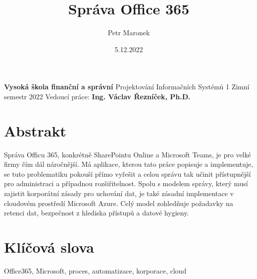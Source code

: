 \documentclass[12pt]{article}
\title{Správa Office 365}
\author{Petr Maronek}
\date{5.12.2022}
\begin{document}
    \begin{sloppypar}
	\begin{spacing}{1.15}
        \rmfamily
		\maketitle
		\begin{center}
			\textbf{Vysoká škola finanční a správní}\linebreak
			Projektování Informačních Systémů 1\linebreak
			Zimní semestr 2022\linebreak
			Vedoucí práce: \textbf{Ing. Václav Řezníček, Ph.D.}
		\end{center}
		\pagebreak

		\section*{Abstrakt}
		Správa Officu 365, konkrétně SharePointu Online a Microsoft Teams, je pro velké 
        firmy čím dál náročnější. Má aplikace, kterou tato práce popisuje a implementuje, 
        se tuto problematiku pokouší přímo vyřešit a celou správu tak učinit přístupnější 
        pro administraci a případnou rozšiřitelnost. Spolu s modelem správy, který musí 
        zajistit korporátní zásady pro uchování dat, je také zásadní implementace v cloudovém 
        prostředí Microsoft Azure. Celý model zohledňuje požadavky na retenci dat, bezpečnost 
        z hlediska přístupů a datové hygieny.

		\section*{Klíčová slova}
		Office365, Microsoft, proces, automatizace, korporace, cloud
		\pagebreak
		    

\end{spacing}
\end{sloppypar}
\end{document}
